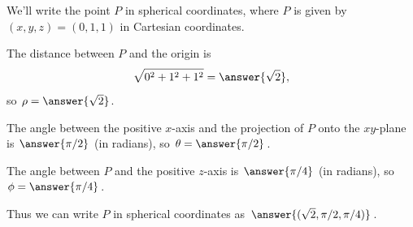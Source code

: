 \documentclass{ximera}
\begin{document}
\begin{example}
We'll write the point $P$ in spherical coordinates, where $P$ is given by $(x,y,z) = (0,1,1)$ in Cartesian coordinates.

\begin{image}
\end{image}

The distance between $P$ and the origin is
\[
\sqrt{0^2 + 1^2 + 1^2} = \answer{\sqrt{2}},
\]
so $\rho = \answer{\sqrt{2}}$.

The angle between the positive $x$-axis and the projection of $P$ onto the $xy$-plane is $\answer{\pi/2}$ (in radians), so $\theta = \answer{\pi/2}$.

The angle between $P$ and the positive $z$-axis is $\answer{\pi/4}$ (in radians), so $\phi = \answer{\pi/4}$.

Thus we can write $P$ in spherical coordinates as $\answer{(\sqrt{2}, \pi/2,\pi/4)}$.

\end{example}
\end{document}
